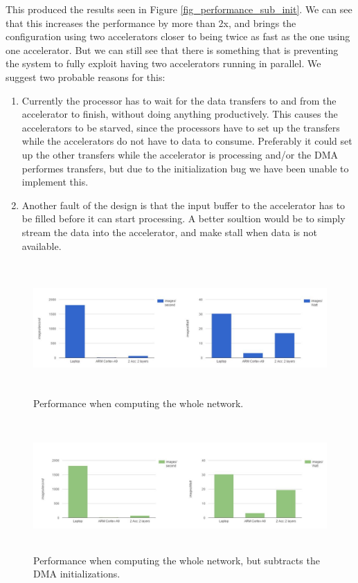This produced the results seen in Figure \ref{fig_performance_sub_init}. We can see that this increases the performance  by more than 2x, and brings the configuration using two accelerators closer to being twice as fast as the one using one accelerator. But we can still see that there is something that is preventing the system to fully exploit having two accelerators running in parallel. We suggest two probable reasons for this:

\begin{enumerate}
\item Currently the processor has to wait for the data transfers to and from the accelerator to finish, without doing anything productively. This causes the accelerators to be starved, since the processors have to set up the transfers while the accelerators do not have to data to consume. Preferably it could set up the other transfers while the accelerator is processing and/or the DMA performes transfers, but due to the initialization bug we have been unable to implement this. 
\item Another fault of the design is that the input buffer to the accelerator has to be filled before it can start processing. A better soultion would be to simply stream the data into the accelerator, and make stall when data is not available. 
\end{enumerate}









\begin{figure}[h!]
	\centering
	\includegraphics[width=1.0\textwidth,height=5cm]{Figures/Results/performance_whole_system}
	\caption{Performance when computing the whole network.}
	\label{fig_performance_whole_system}
\end{figure}

\begin{figure}[h!]
	\centering
	\includegraphics[width=1.0\textwidth,height=5cm]{Figures/Results/performance_whole_system_sub_dma_init}
	\caption{Performance when computing the whole network, but subtracts the DMA initializations.}
	\label{fig_performance_whole_system_sub_dma_init}
\end{figure}


